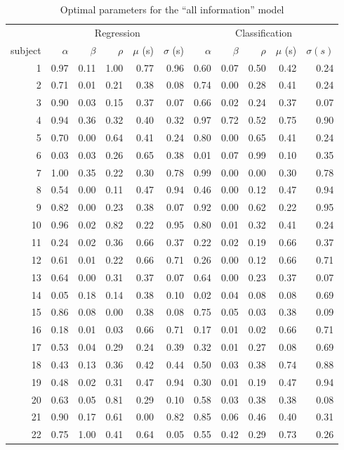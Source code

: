 \documentclass[a4paper]{vanvliet_paper}
\begin{document}
\begin{table}
    \begin{tabular}{rrrrrr|rrrrr}
    & \multicolumn{5}{c}{Regression} & \multicolumn{5}{c}{Classification} \\
    subject & $\alpha$ & $\beta$ & $\rho$ & $\mu$ (s) & $\sigma$ (s) & $\alpha$ & $\beta$ & $\rho$ & $\mu$ (s) & $\sigma (s)$ \\
    \midrule
     1 & 0.97 & 0.11 & 1.00 & 0.77 & 0.96 & 0.60 & 0.07 & 0.50 & 0.42 & 0.24 \\
     2 & 0.71 & 0.01 & 0.21 & 0.38 & 0.08 & 0.74 & 0.00 & 0.28 & 0.41 & 0.24 \\
     3 & 0.90 & 0.03 & 0.15 & 0.37 & 0.07 & 0.66 & 0.02 & 0.24 & 0.37 & 0.07 \\
     4 & 0.94 & 0.36 & 0.32 & 0.40 & 0.32 & 0.97 & 0.72 & 0.52 & 0.75 & 0.90 \\
     5 & 0.70 & 0.00 & 0.64 & 0.41 & 0.24 & 0.80 & 0.00 & 0.65 & 0.41 & 0.24 \\
     6 & 0.03 & 0.03 & 0.26 & 0.65 & 0.38 & 0.01 & 0.07 & 0.99 & 0.10 & 0.35 \\
     7 & 1.00 & 0.35 & 0.22 & 0.30 & 0.78 & 0.99 & 0.00 & 0.00 & 0.30 & 0.78 \\
     8 & 0.54 & 0.00 & 0.11 & 0.47 & 0.94 & 0.46 & 0.00 & 0.12 & 0.47 & 0.94 \\
     9 & 0.82 & 0.00 & 0.23 & 0.38 & 0.07 & 0.92 & 0.00 & 0.62 & 0.22 & 0.95 \\
    10 & 0.96 & 0.02 & 0.82 & 0.22 & 0.95 & 0.80 & 0.01 & 0.32 & 0.41 & 0.24 \\
    11 & 0.24 & 0.02 & 0.36 & 0.66 & 0.37 & 0.22 & 0.02 & 0.19 & 0.66 & 0.37 \\
    12 & 0.61 & 0.01 & 0.22 & 0.66 & 0.71 & 0.26 & 0.00 & 0.12 & 0.66 & 0.71 \\
    13 & 0.64 & 0.00 & 0.31 & 0.37 & 0.07 & 0.64 & 0.00 & 0.23 & 0.37 & 0.07 \\
    14 & 0.05 & 0.18 & 0.14 & 0.38 & 0.10 & 0.02 & 0.04 & 0.08 & 0.08 & 0.69 \\
    15 & 0.86 & 0.08 & 0.00 & 0.38 & 0.08 & 0.75 & 0.05 & 0.03 & 0.38 & 0.09 \\
    16 & 0.18 & 0.01 & 0.03 & 0.66 & 0.71 & 0.17 & 0.01 & 0.02 & 0.66 & 0.71 \\
    17 & 0.53 & 0.04 & 0.29 & 0.24 & 0.39 & 0.32 & 0.01 & 0.27 & 0.08 & 0.69 \\
    18 & 0.43 & 0.13 & 0.36 & 0.42 & 0.44 & 0.50 & 0.03 & 0.38 & 0.74 & 0.88 \\
    19 & 0.48 & 0.02 & 0.31 & 0.47 & 0.94 & 0.30 & 0.01 & 0.19 & 0.47 & 0.94 \\
    20 & 0.63 & 0.05 & 0.81 & 0.29 & 0.10 & 0.58 & 0.03 & 0.38 & 0.38 & 0.08 \\
    21 & 0.90 & 0.17 & 0.61 & 0.00 & 0.82 & 0.85 & 0.06 & 0.46 & 0.40 & 0.31 \\
    22 & 0.75 & 1.00 & 0.41 & 0.64 & 0.05 & 0.55 & 0.42 & 0.29 & 0.73 & 0.26 \\
    \end{tabular}
    \caption{Optimal parameters for the ``all information'' model}\label{tab:params}
\end{table}
\end{document}
